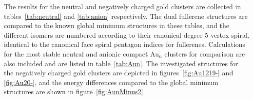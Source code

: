The results for the neutral and negatively charged gold clusters are collected
in tables~\ref{tab:neutral} and \ref{tab:anion} respectively. The dual fullerene
structures are compared to the known global minimum structures in these tables,
and the different isomers are numbered according to their canonical degree 5
vertex spiral, identical to the canonical face spiral pentagon indices for
fullerenes.\autocite{Fowler-atlas-2006} Calculations for the most stable neutral
and anionic compact Au$_n$ clusters for comparison are also included and are
listed in table~\ref{tab:Aun}. The investigated structures for the negatively
charged gold clusters are depicted in figures~\ref{fig:Au1219-} and
\ref{fig:Au20-}, and the energy differences compared to the global minimum
structures are shown in figure~\ref{fig:AunMinus2}.
%
%
\begin{figure}[htbp]
	\begin{center}
	\\

\end{center}
\end{figure}
